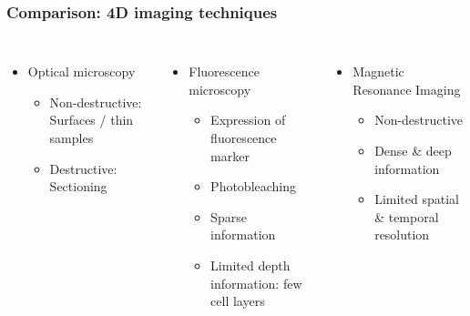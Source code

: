 \documentclass{beamer}
\begin{document}
\begin{frame}
  \frametitle{Comparison: 4D imaging techniques}
  \begin{columns}[T]
    \begin{itemize}
    \item Optical microscopy
      \begin{itemize}
      \item Non-destructive: Surfaces / thin samples
      \item Destructive: Sectioning
      \end{itemize}
    \end{itemize}
      \vfill
    \begin{itemize}
    \item Fluorescence microscopy
      \begin{itemize}
      \item Expression of fluorescence marker
      \item Photobleaching
      \item Sparse information
      \item Limited depth information: few cell layers
      \end{itemize}
    \end{itemize}
      \vfill
    \begin{itemize}
    \item Magnetic Resonance Imaging
      \begin{itemize}
      \item Non-destructive 
      \item Dense \& deep information
      \item Limited spatial \& temporal resolution
      \end{itemize}
    \end{itemize}
\end{columns}
\end{frame}
\end{document}
